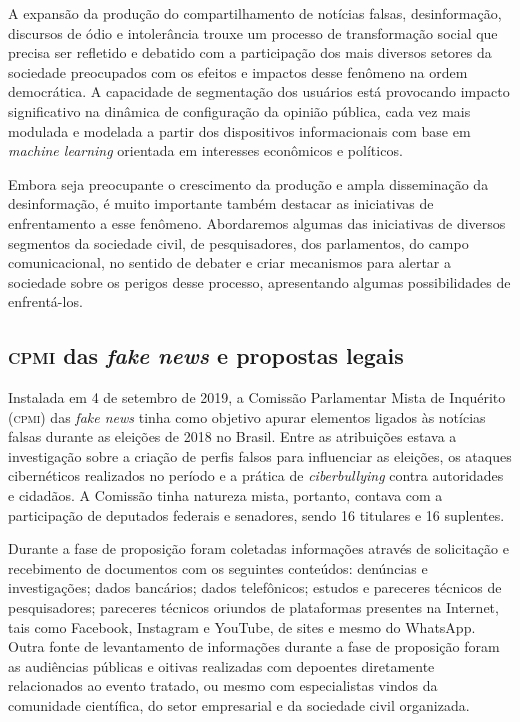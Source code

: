 A expansão da produção do compartilhamento de notícias falsas,
desinformação, discursos de ódio e intolerância trouxe um processo
de transformação social que precisa ser refletido e debatido com a
participação dos mais diversos setores da sociedade preocupados com os
efeitos e impactos desse fenômeno na ordem democrática. A capacidade de
segmentação dos usuários está provocando impacto significativo na
dinâmica de configuração da opinião pública, cada vez mais modulada e
modelada a partir dos dispositivos informacionais com base em
\textit{machine learning} orientada em interesses econômicos e
políticos.

Embora seja preocupante o crescimento da produção e ampla disseminação
da desinformação, é muito importante também destacar as iniciativas de
enfrentamento a esse fenômeno. Abordaremos algumas das iniciativas de
diversos segmentos da sociedade civil, de pesquisadores, dos
parlamentos, do campo comunicacional, no sentido de debater e criar
mecanismos para alertar a sociedade sobre os perigos desse processo,
apresentando algumas possibilidades de enfrentá-los.

\subsection{\textsc{cpmi} das \textit{fake news} e propostas legais}

Instalada em 4 de setembro de 2019, a Comissão Parlamentar Mista de
Inquérito (\textsc{cpmi}) das \textit{fake news} tinha como objetivo apurar elementos
ligados às notícias falsas durante as eleições de 2018 no Brasil. Entre
as atribuições estava a investigação sobre a criação de perfis falsos
para influenciar as eleições, os ataques cibernéticos realizados no
período e a prática de \textit{ciberbullying} contra autoridades e
cidadãos. A Comissão tinha natureza mista, portanto, contava com a
participação de deputados federais e senadores, sendo 16 titulares e 16
suplentes.

Durante a fase de proposição foram coletadas informações através de
solicitação e recebimento de documentos com os seguintes conteúdos:
denúncias e investigações; dados bancários; dados telefônicos; estudos e
pareceres técnicos de pesquisadores; pareceres técnicos oriundos de
plataformas presentes na Internet, tais como Facebook, Instagram e
YouTube, de sites e mesmo do WhatsApp. Outra fonte de levantamento de
informações durante a fase de proposição foram as audiências públicas e
oitivas realizadas com depoentes diretamente relacionados ao evento
tratado, ou mesmo com especialistas vindos da comunidade científica, do
setor empresarial e da sociedade civil organizada.

